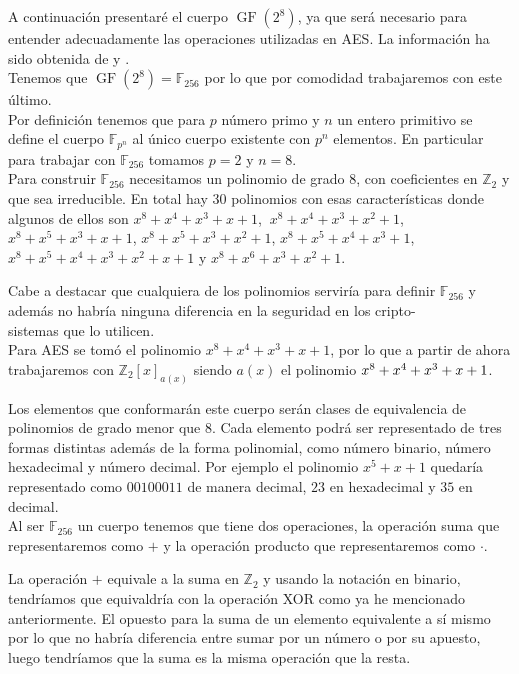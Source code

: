 A continuación presentaré el cuerpo $\operatorname{GF}(2^8)$, ya que será necesario para entender adecuadamente las operaciones utilizadas en AES. La información ha sido obtenida de \cite{criptografia} y \cite{dem1}.\\
Tenemos que $\operatorname{GF}(2^8)=\mathbb{F}_{256}$ por lo que por comodidad trabajaremos con este último.\\
Por definición tenemos que para $p$ número primo y $n$ un entero primitivo se define el cuerpo $\mathbb{F}_{p^n}$ al único cuerpo existente con $p^n$ elementos. En particular para trabajar con $\mathbb{F}_{256}$ tomamos $p=2$ y $n=8$.\\
Para construir $\mathbb{F}_{256}$ necesitamos un polinomio de grado 8, con coeficientes en $\mathbb{Z}_2$ y que sea irreducible. En total hay 30 polinomios con esas características donde algunos de ellos son 
$x^8+x^4+x^3+x+1$, $\:x^8+x^4+x^3+x^2+1$, $x^8+x^5+x^3+x+1$, $x^8+x^5+x^3+x^2+1$, $x^8+x^5+x^4+x^3+1$, $x^8+x^5+x^4+x^3+x^2+x+1$ y $x^8+x^6+x^3+x^2+1$.

Cabe a destacar que cualquiera de los polinomios serviría para definir $\mathbb{F}_{256}$ y además no habría ninguna diferencia en la seguridad en los cripto-\\sistemas que lo utilicen. \\
Para AES se tomó el polinomio $x^8+x^4+x^3+x+1$, por lo que a partir de ahora trabajaremos con $\mathbb{Z}_2[x]_{a(x)}$ siendo $a(x)$ el polinomio $x^8+x^4+x^3+x\\+1$.

Los elementos que conformarán este cuerpo serán clases de equivalencia de polinomios  de grado menor que 8. Cada elemento podrá ser representado de tres formas distintas además de la forma polinomial, como número binario, número hexadecimal y número decimal. Por ejemplo el polinomio $x^5+x+1$ quedaría representado como $00100011$ de manera decimal, $23$ en hexadecimal y $35$ en decimal.\\
Al ser $\mathbb{F}_{256}$ un cuerpo tenemos que tiene dos operaciones, la operación suma que representaremos como $+$ y la operación producto que representaremos como $\cdot$.

La operación $+$ equivale a la suma en $\mathbb{Z}_2$ y usando la notación en binario, tendríamos que equivaldría con la operación XOR como ya he mencionado anteriormente. El opuesto para la suma de un elemento equivalente a sí mismo por lo que no habría diferencia entre sumar por un número o por su apuesto, luego tendríamos que la suma es la misma operación que la resta.

